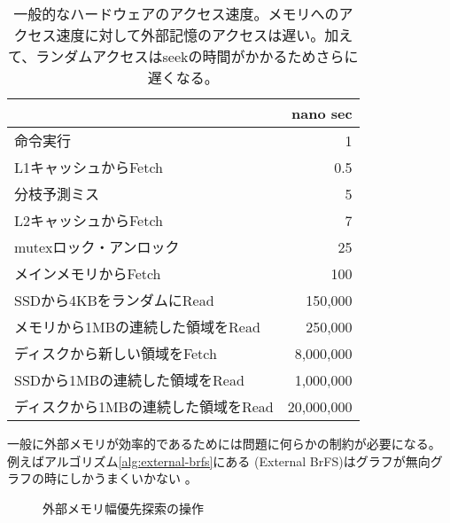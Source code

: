 \begin{table}
\centering
\caption{一般的なハードウェアのアクセス速度。メモリへのアクセス速度に対して外部記憶のアクセスは遅い。加えて、ランダムアクセスはseekの時間がかかるためさらに遅くなる。 }
\label{tbl:latency}
\begin{tabular}{|l|r|}
		   & nano sec \\ \hline
	命令実行 & 1 \\
	L1キャッシュからFetch & 0.5 \\
	分枝予測ミス 		& 5 \\
	L2キャッシュからFetch & 7 \\
	mutexロック・アンロック			& 25 \\
	メインメモリからFetch  	& 100 \\
	SSDから4KBをランダムにRead         & 150,000 \\
	メモリから1MBの連続した領域をRead & 250,000 \\
	ディスクから新しい領域をFetch & 8,000,000 \\
	SSDから1MBの連続した領域をRead		& 1,000,000 \\
	ディスクから1MBの連続した領域をRead 	& 20,000,000 \\
	
\end{tabular}
\end{table}


一般に外部メモリが効率的であるためには問題に何らかの制約が必要になる。
例えばアルゴリズム\ref{alg:external-brfs}にある (External BrFS)はグラフが無向グラフの時にしかうまくいかない \cite{mehlhorn2002external}。

\begin{figure}
  \centering
  \scalebox{0.75}{
  \begin{tikzpicture}[scale=0.6]
    
  \end{tikzpicture}
  }
  \caption{外部メモリ幅優先探索の操作}
  \label{fig:external-brfs}
\end{figure}

